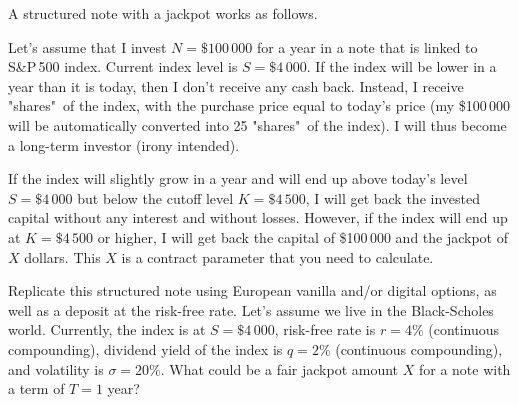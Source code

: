 \documentclass[a4paper,14pt]{extarticle}
\begin{document}
A structured note with a jackpot works as follows.

Let's assume that I invest $N=\$100\,000$ for a year in a note that is linked to S\&P\,500 index. Current index level is $S=\$4\,000$. If
the index will be lower in a year than it is today, then I don't receive any cash back. Instead, I receive "shares"\ of the index,
with the purchase price equal to today's price (my \$100\,000 will be automatically converted into 25 "shares"\ of the
index). I will thus become a long-term investor (irony intended).

If the index will slightly grow in a year and will end up above today's level $S=\$4\,000$ but below the cutoff level $K=\$4\,500$, I will get back the invested capital without any interest and without losses. However, if the index will end up at $K=\$4\,500$ or higher, I will  get back the capital of \$100\,000 and the jackpot of $X$ dollars. This $X$ is a contract parameter that you need to calculate.

Replicate this structured note using European vanilla and/or digital options, as well as a
deposit at the risk-free rate. Let's assume we live in the Black-Scholes world. Currently, the index is at $S=\$4\,000$,
risk-free rate is $r=4\%$ (continuous compounding), dividend yield of the index is $q=2\%$ (continuous
compounding), and volatility is $\sigma=20\%$. What could be a fair jackpot amount $X$ for a note with a term of $T=1$ year?
\end{document}
